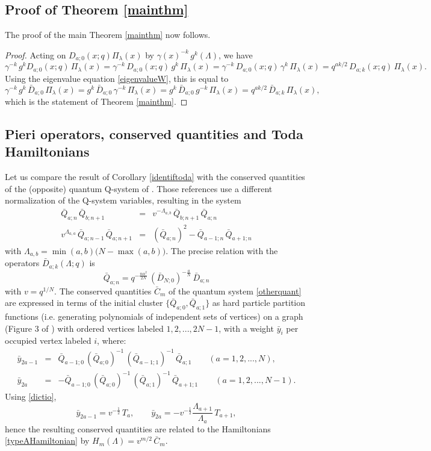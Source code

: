 \documentclass[12pt]{amsart}
\newcommand{\al}{{\alpha}}
\newcommand{\lL}{{\Lambda}}
\numberwithin{equation}{section}
\begin{document}
\subsection{Proof of Theorem \ref{mainthm}}\label{sec:theproof}
The proof of the main Theorem \ref{mainthm} now follows.
\begin{proof}
Acting on $D_{a;0}(x;q)\Pi_\lambda(x)$ by $\gamma(x)^{-k} \,g^k(\Lambda)$, we have
$$
\gamma^{-k}\,g^k D_{a;0}(x;q) \,\Pi_\lambda(x) = \gamma^{-k} \,D_{a;0}(x;q)\,g^k \,\Pi_\lambda(x) 
=  \gamma^{-k}\,D_{a;0}(x;q)\,\gamma^{k}\,\Pi_\lambda(x)= q^{a k/2} \,D_{a;k}(x;q) \,\Pi_\lambda(x).
$$
Using the eigenvalue equation \eqref{eigenvalueW}, this is equal to 
$$\gamma^{-k}\,g^k \,\bar D_{a;0}\,\Pi_\lambda(x) = g^k \,\bar D_{a;0}\,\gamma^{-k}\,\Pi_\lambda(x)  
= g^k \, \bar D_{a;0}\,g^{-k}\,\Pi_\lambda(x)= q^{a k/2} \,\bar D_{a;k}\,\Pi_\lambda(x),$$
which is the statement of Theorem \ref{mainthm}.
\end{proof}

\subsection{Pieri operators, conserved quantities and Toda Hamiltonians}
\label{Identification}
Let us compare the result of  Corollary \ref{identiftoda} with the conserved quantities of the (opposite) quantum
Q-system of \cite{DFKnoncom,DFK10,DFK15}. Those references use a different normalization of the Q-system variables, resulting in the system
\begin{eqnarray}
\bar Q_{a;n}\, \bar Q_{b;n+1}&=& v^{-\Lambda_{a,b}} \,\bar Q_{b;n+1}\, \bar Q_{a;n}\nonumber \\
v^{\Lambda_{a,a}} \,\bar Q_{a;n-1}\, \bar Q_{a;n+1}&=& (\bar Q_{a;n})^2-\bar Q_{a-1;n}\, \bar Q_{a+1;n}\label{otherquant}
\end{eqnarray}
with $\Lambda_{a,b}=\min(a,b)\big( N-\max(a,b)\big)$.
The precise relation with the operators $\bar D_{a;k}(\Lambda;q)$ is
\begin{equation}\label{dictio}
\bar Q_{a;n}=q^{-\frac{n \al^2}{2N}}\,(\bar D_{N;0})^{-\frac{a}{N}}\,\bar D_{a;n}
\end{equation}
with $v=q^{1/N}$. The conserved quantities $\bar C_m$ of the quantum system \eqref{otherquant}
are expressed in terms of the initial cluster $\{ \bar Q_{a;0},\bar Q_{a;1}\}$
as hard particle partition functions (i.e. generating polynomials of independent sets of vertices) on a graph (Figure 3 of \cite{DFK10})
with ordered vertices labeled $1,2,...,2N-1$, with a weight $\bar y_i$ per occupied vertex labeled $i$, where: 
\begin{eqnarray*}
\bar y_{2a-1}&=&\bar Q_{a-1;0}\,(\bar Q_{a;0})^{-1}\, (\bar Q_{a-1;1})^{-1}\, \bar Q_{a;1} \qquad (a=1,2,...,N),\\
\bar y_{2a}&=&-\bar Q_{a-1;0}\,(\bar Q_{a;0})^{-1}\, (\bar Q_{a;1})^{-1}\, \bar Q_{a+1;1} \qquad (a=1,2,...,N-1).
\end{eqnarray*}
Using \eqref{dictio},
$$\bar y_{2a-1}=v^{-\frac{1}{2}}\,T_a,\qquad \bar y_{2a}=-v^{-\frac{1}{2}} \frac{\lL_{a+1}}{\lL_a}\, T_{a+1}, $$
hence the resulting conserved quantities are related to the Hamiltonians \eqref{typeAHamiltonian} by $H_m(\lL)= v^{m/2}\, \bar C_m$.
\end{document}
